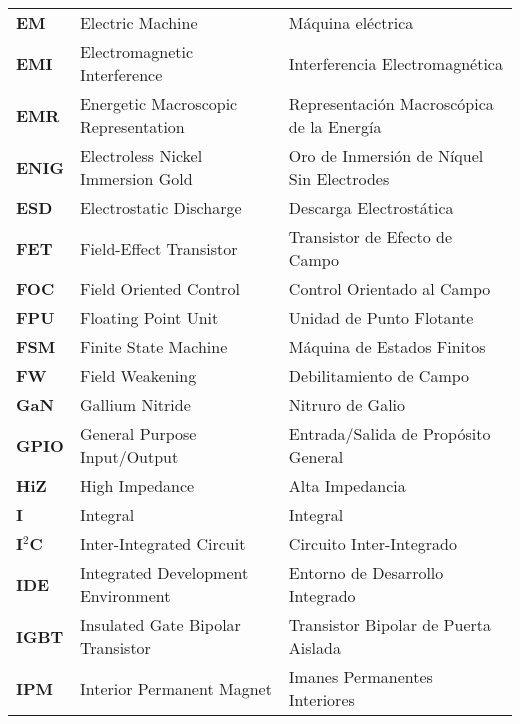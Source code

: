 \begin{longtable}{>{\bfseries}p{3cm} p{5cm} p{5cm}}
\textbf{EM} & Electric Machine & Máquina eléctrica \\

\textbf{EMI} & Electromagnetic Interference & Interferencia Electromagnética \\

\textbf{EMR} & Energetic Macroscopic Representation & Representación Macroscópica de la Energía \\

\textbf{ENIG} & Electroless Nickel Immersion Gold & Oro de Inmersión de Níquel Sin Electrodes \\

\textbf{ESD} & Electrostatic Discharge & Descarga Electrostática \\

\textbf{FET} & Field-Effect Transistor & Transistor de Efecto de Campo  \\

\textbf{FOC} & Field Oriented Control & Control Orientado al Campo \\

\textbf{FPU} & Floating Point Unit & Unidad de Punto Flotante \\

\textbf{FSM} & Finite State Machine & Máquina de Estados Finitos \\

\textbf{FW} & Field Weakening & Debilitamiento de Campo \\

\textbf{GaN} & Gallium Nitride & Nitruro de Galio \\

\textbf{GPIO} & General Purpose Input/Output & Entrada/Salida de Propósito General \\

\textbf{HiZ} & High Impedance & Alta Impedancia \\

\textbf{I} & Integral & Integral \\

\textbf{I$^2$C} & Inter-Integrated Circuit & Circuito Inter-Integrado \\

\textbf{IDE} & Integrated Development Environment & Entorno de Desarrollo Integrado \\

\textbf{IGBT} & Insulated Gate Bipolar Transistor & Transistor Bipolar de Puerta Aislada \\

\textbf{IPM} & Interior Permanent Magnet & Imanes Permanentes Interiores \\


\end{longtable}
